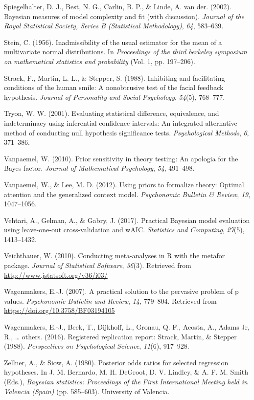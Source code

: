 \documentclass[english,man]{apa6}
\theoremstyle{definition}
\theoremstyle{definition}
\theoremstyle{definition}
\theoremstyle{remark}
\begin{document}
\hypertarget{ref-Spiegelhalter:etal:2002}{}
Spiegelhalter, D. J., Best, N. G., Carlin, B. P., \& Linde, A. van der.
(2002). Bayesian measures of model complexity and fit (with discussion).
\emph{Journal of the Royal Statistical Society, Series B (Statistical
Methodology)}, \emph{64}, 583--639.

\hypertarget{ref-Stein:1956}{}
Stein, C. (1956). Inadmissibility of the usual estimator for the mean of
a multivariate normal distributions. In \emph{Proceedings of the third
berkeley symposium on mathematical statistics and probability} (Vol. 1,
pp. 197--206).

\hypertarget{ref-Strack:etal:1988}{}
Strack, F., Martin, L. L., \& Stepper, S. (1988). Inhibiting and
facilitating conditions of the human smile: A nonobtrusive test of the
facial feedback hypothesis. \emph{Journal of Personality and Social
Psychology}, \emph{54}(5), 768--777.

\hypertarget{ref-Tryon:2001}{}
Tryon, W. W. (2001). Evaluating statistical difference, equivalence, and
indeterminacy using inferential confidence intervals: An integrated
alternative method of conducting null hypothesis significance tests.
\emph{Psychological Methods}, \emph{6}, 371--386.

\hypertarget{ref-Vanpaemel:2010}{}
Vanpaemel, W. (2010). Prior sensitivity in theory testing: An apologia
for the Bayes factor. \emph{Journal of Mathematical Psychology},
\emph{54}, 491--498.

\hypertarget{ref-Vanpaemel:Lee:2012}{}
Vanpaemel, W., \& Lee, M. D. (2012). Using priors to formalize theory:
Optimal attention and the generalized context model. \emph{Psychonomic
Bulletin \& Review}, \emph{19}, 1047--1056.

\hypertarget{ref-Vehtari:etal:2017}{}
Vehtari, A., Gelman, A., \& Gabry, J. (2017). Practical Bayesian model
evaluation using leave-one-out cross-validation and wAIC.
\emph{Statistics and Computing}, \emph{27}(5), 1413--1432.

\hypertarget{ref-Veichtbauer:2010}{}
Veichtbauer, W. (2010). Conducting meta-analyses in R with the metafor
package. \emph{Journal of Statistical Software}, \emph{36}(3). Retrieved
from \url{http://www.jstatsoft.org/v36/i03/}

\hypertarget{ref-Wagenmakers:2007}{}
Wagenmakers, E.-J. (2007). A practical solution to the pervasive problem
of p values. \emph{Psychonomic Bulletin and Review}, \emph{14},
779--804. Retrieved from \url{https://doi.org/10.3758/BF03194105}

\hypertarget{ref-Wagenmakers:etal:2016}{}
Wagenmakers, E.-J., Beek, T., Dijkhoff, L., Gronau, Q. F., Acosta, A.,
Adams Jr, R., \ldots{} others. (2016). Registered replication report:
Strack, Martin, \& Stepper (1988). \emph{Perspectives on Psychological
Science}, \emph{11}(6), 917--928.

\hypertarget{ref-Zellner:Siow:1980}{}
Zellner, A., \& Siow, A. (1980). Posterior odds ratios for selected
regression hypotheses. In J. M. Bernardo, M. H. DeGroot, D. V. Lindley,
\& A. F. M. Smith (Eds.), \emph{Bayesian statistics: Proceedings of the
First International Meeting held in Valencia (Spain)} (pp. 585--603).
University of Valencia.
\end{document}
